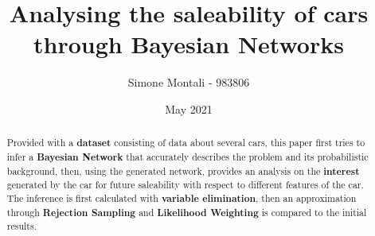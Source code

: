 \documentclass[10pt,a4paper]{article}
\begin{document}
\title{Analysing the saleability of cars through Bayesian Networks} %
\author{Simone Montali - 983806}
\date{May 2021} %
\maketitle %




\begin{abstract}
\normalsize
Provided with a \textbf{dataset} consisting of data about several cars, this paper first tries to infer a \textbf{Bayesian Network} that accurately describes the problem and its probabilistic background, then, using the generated network, provides an analysis on the \textbf{interest} generated by the car for future saleability with respect to different features of the car. The inference is first calculated with \textbf{variable elimination}, then an approximation through \textbf{Rejection Sampling} and \textbf{Likelihood Weighting} is compared to the initial results.

\end{abstract}

\setcounter{tocdepth}{2}
\tableofcontents


\clearpage








\clearpage


\clearpage
{}

\end{document}
